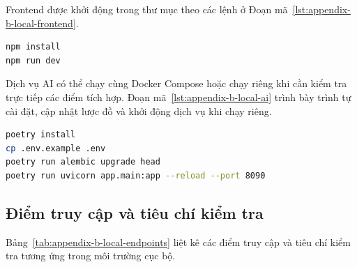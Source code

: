 Frontend được khởi động trong thư mục  theo các lệnh ở Đoạn mã~\ref{lst:appendix-b-local-frontend}.

\begin{lstlisting}[language=bash, caption={Khởi động frontend trong môi trường cục bộ}, label={lst:appendix-b-local-frontend}]
npm install
npm run dev
\end{lstlisting}

Dịch vụ AI có thể chạy cùng Docker Compose hoặc chạy riêng khi cần kiểm tra trực tiếp các điểm tích hợp. Đoạn mã~\ref{lst:appendix-b-local-ai} trình bày trình tự cài đặt, cập nhật lược đồ và khởi động dịch vụ khi chạy riêng.

\begin{lstlisting}[language=bash, caption={Khởi động riêng dịch vụ AI để kiểm thử}, label={lst:appendix-b-local-ai}]
poetry install
cp .env.example .env
poetry run alembic upgrade head
poetry run uvicorn app.main:app --reload --port 8090
\end{lstlisting}

\subsection{Điểm truy cập và tiêu chí kiểm tra}

Bảng~\ref{tab:appendix-b-local-endpoints} liệt kê các điểm truy cập và tiêu chí kiểm tra tương ứng trong môi trường cục bộ.

